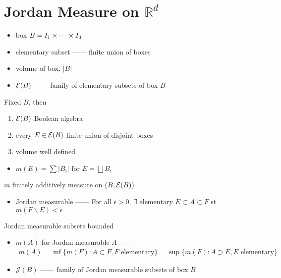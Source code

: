 \section{Jordan Measure on $\mathbb{R}^d$}\label{sec:jordan-measure-on}

\begin{itemize}
    \item box $B = I_1 \times \cdots \times I_d$
    \item elementary subset ------ finite union of boxes
    \item volume of box, $|B|$
    \item $\mathcal{E}(B)$ ------ family of elementary subsets of box $B$
\end{itemize}

\begin{prop}
    Fixed $B$, then
    \begin{enumerate}
        \item $\mathcal{E}(B)$ Boolean algebra
        \item every $E \in \mathcal{E}(B)$ finite union of disjoint boxes
        \item volume well defined
    \end{enumerate}
\end{prop}

\begin{itemize}
    \item $m(E) = \sum|B_i|$ for $E = \bigsqcup B_i$
\end{itemize}

\begin{fact}
    $m$ finitely additively measure on $(B, \mathcal{E}(B))$
\end{fact}

\begin{itemize}
    \item Jordan measurable ------ For all $\epsilon > 0$, $\exists \text{ elementary } E \subset A \subset F$ st $m(F \backslash E) < \epsilon$
\end{itemize}

\begin{fact}
    Jordan measurable subsets bounded
\end{fact}

\begin{itemize}
    \item $m(A)$ for Jordan measurable $A$ ------
    \begin{align*}
        m(A) = \inf\{m(F) : A \subset F, F \text{ elementary}\} = \sup\{m(F) : A \supset E, E \text{ elementary}\}
    \end{align*}
    \item $\mathcal{J}(B)$ ------ family of Jordan measurable subsets of box $B$
\end{itemize}


